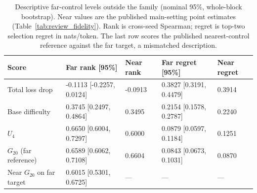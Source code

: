\begin{table}[tp]
\centering
\small
\begin{tabular}{@{}lllll@{}}
\toprule
Score & Far rank [95\%] & Near rank & Far regret [95\%] & Near regret \\
\midrule
Total loss drop & -0.1113 [-0.2257, 0.0124] & -0.0913 & 0.3827 [0.3191, 0.4479] & 0.3914 \\
Base difficulty & 0.3745 [0.2497, 0.4864] & 0.3495 & 0.2154 [0.1578, 0.2787] & 0.2240 \\
$U_4$ & 0.6650 [0.6004, 0.7297] & 0.6000 & 0.0879 [0.0597, 0.1184] & 0.1251 \\
$G_{20}$ (far reference) & 0.6589 [0.6062, 0.7108] & 0.6604 & 0.0843 [0.0673, 0.1031] & 0.0870 \\
Near $G_{20}$ on far target & 0.6015 [0.5301, 0.6725] & --- & --- & --- \\
\bottomrule
\end{tabular}
\caption{Descriptive far-control levels outside the family (nominal 95\%, whole-block bootstrap). Near values are the published main-setting point estimates (Table~\ref{tab:review_fidelity}). Rank is cross-seed Spearman; regret is top-two selection regret in nats/token. The last row scores the published nearest-control reference against the far target, a mismatched description.}
\label{tab:e01_descriptive}
\end{table}

